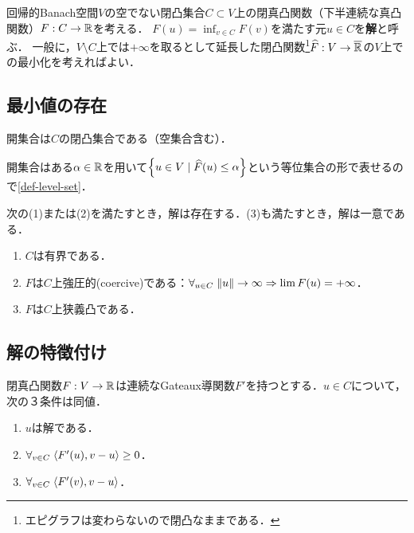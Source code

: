 \documentclass[uplatex,dvipdfmx]{jsreport}
\begin{document}
\begin{problem}
    回帰的Banach空間$V$の空でない閉凸集合$C\subset V$上の閉真凸関数（下半連続な真凸関数）$F:C\to\mathbb{R}$を考える．
    $F(u)=\inf_{v\in C}F(v)$を満たす元$u\in C$を\textbf{解}と呼ぶ．
    一般に，$V\setminus C$上では$+\infty$を取るとして延長した閉凸関数\footnote{エピグラフは変わらないので閉凸なままである．}$\widehat{F}:V\to\overline{\mathbb{R}}$の$V$上での最小化を考えればよい．
\end{problem}

\subsection{最小値の存在}

\begin{proposition}
    開集合は$C$の閉凸集合である（空集合含む）．
\end{proposition}
\begin{Proof}
    開集合はある$\alpha\in\mathbb{R}$を用いて$\left\{u\in V\mid\widehat{F}(u)\le\alpha\right\}$という等位集合の形で表せるので\ref{def-level-set}．
\end{Proof}

\begin{proposition}
    次の(1)または(2)を満たすとき，解は存在する．(3)も満たすとき，解は一意である．
    \begin{enumerate}
        \item $C$は有界である．
        \item $F$は$C$上強圧的(coercive)である：$\forall_{u\in C}\;\|u\|\to\infty\Rightarrow\lim F(u)=+\infty$．
        \item $F$は$C$上狭義凸である．
    \end{enumerate}
\end{proposition}

\subsection{解の特徴付け}

\begin{proposition}
    閉真凸関数$F:V\to\mathbb{R}$は連続なGateaux導関数$F'$を持つとする．$u\in C$について，次の３条件は同値．
    \begin{enumerate}
        \item $u$は解である．
        \item $\forall_{v\in C}\;\langle F'(u),v-u\rangle\ge0$．
        \item $\forall_{v\in C}\;\langle F'(v),v-u\rangle$．
    \end{enumerate}
\end{proposition}
\end{document}
